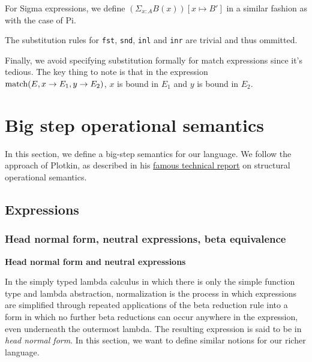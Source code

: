 \documentclass{article}
\begin{document}
For Sigma expressions, we define $(\Sigma_{x : A} B(x)) [x \mapsto B']$ in a
similar fashion as with the case of Pi.

The substitution rules for \verb|fst|, \verb|snd|, \verb|inl| and \verb|inr| are
trivial and thus ommitted.

Finally, we avoid specifying substitution formally for match expressions since it's
tedious. The key thing to note is that in the expression
$\operatorname{match}(E, x \rightarrow E_1, y \rightarrow E_2)$, $x$ is bound in $E_1$ and $y$
is bound in $E_2$.

\section{Big step operational semantics}
\begin{comment}
  https://www.andres-loeh.de/LambdaPi/LambdaPi.pdf
  http://math.andrej.com/2012/11/08/how-to-implement-dependent-type-theory-i/
  
  http://fsl.cs.illinois.edu/images/archive/b/b3/20110221180817!CS522-Spring-2011-PL-book-bigstep.pdf
  https://www.cs.cornell.edu/courses/cs4110/2010fa/lectures/lecture03.pdf
\end{comment}

In this section, we define a big-step semantics for our language.
We follow the approach of Plotkin, as described in his
\href{https://web.eecs.umich.edu/~weimerw/2014-6610/reading/plotkin81structural.pdf}
{famous technical report} on structural operational semantics.

\subsection{Expressions}
\subsubsection{Head normal form, neutral expressions, beta equivalence}
\textbf{Head normal form and neutral expressions}

In the simply typed lambda calculus in which there is only the simple function 
type and lambda abstraction, normalization is the process in which 
expressions are simplified through repeated applications of the beta reduction rule
into a form in which no further beta reductions can occur anywhere in the 
expression, even underneath the outermost lambda.
The resulting expression is said to be in \textit{head normal form}. In this
section, we want to define similar notions for our richer language.
\end{document}
